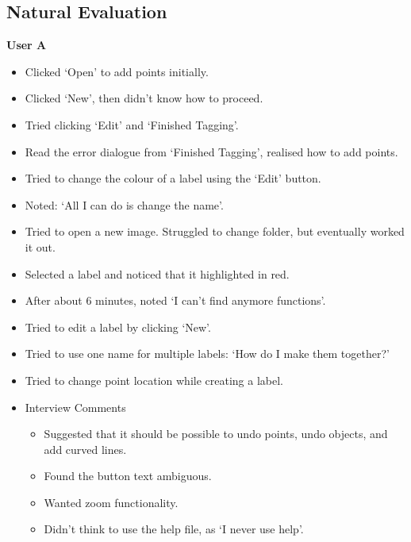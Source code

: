 \documentclass[11pt,twocolumn]{article}
\begin{document}
\subsection{Natural Evaluation}

\textbf{User A}
\begin{itemize}
\item Clicked `Open' to add points initially.
\item Clicked `New', then didn't know how to proceed.
\item Tried clicking `Edit' and `Finished Tagging'.
\item Read the error dialogue from `Finished Tagging', realised how to add points.
\item Tried to change the colour of a label using the `Edit' button.
\item Noted: `All I can do is change the name'.
\item Tried to open a new image. Struggled to change folder, but eventually worked it out.
\item Selected a label and noticed that it highlighted in red.
\item After about 6 minutes, noted `I can't find anymore functions'.
\item Tried to edit a label by clicking `New'.
\item Tried to use one name for multiple labels: `How do I make them together?'
\item Tried to change point location while creating a label.
\item Interview Comments
\begin{itemize}
\item Suggested that it should be possible to undo points, undo objects, and add curved lines.
\item Found the button text ambiguous.
\item Wanted zoom functionality.
\item Didn't think to use the help file, as `I never use help'.
\end{itemize}
\end{itemize}
\end{document}
